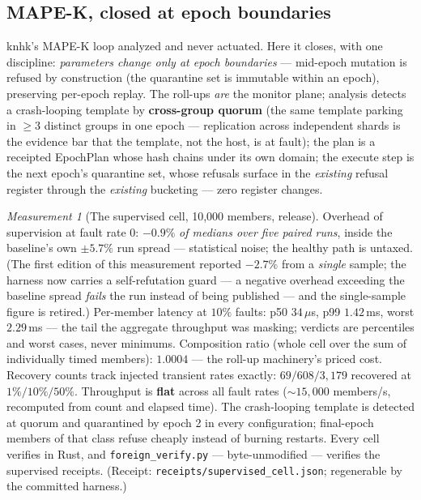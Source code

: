 \documentclass[11pt,a4paper]{article}
\theoremstyle{definition}
\theoremstyle{remark}
\newtheorem{measurement}[theorem]{Measurement}
\begin{document}
\subsection{MAPE-K, closed at epoch boundaries}

knhk's MAPE-K loop analyzed and never actuated. Here it closes, with one
discipline: \emph{parameters change only at epoch boundaries} ---
mid-epoch mutation is refused by construction (the quarantine set is
immutable within an epoch), preserving per-epoch replay. The roll-ups
\emph{are} the monitor plane; analysis detects a crash-looping template by
\textbf{cross-group quorum} (the same template parking in $\ge 3$ distinct
groups in one epoch --- replication across independent shards is the
evidence bar that the template, not the host, is at fault); the plan is a
receipted \textsf{EpochPlan} whose hash chains under its own domain; the
execute step is the next epoch's quarantine set, whose refusals surface in
the \emph{existing} refusal register through the \emph{existing}
bucketing --- zero register changes.

\begin{measurement}[The supervised cell, 10{,}000 members, release]
\label{meas:cell}
Overhead of supervision at fault rate $0$: $-0.9\%$ \emph{of medians over
five paired runs}, inside the baseline's own $\pm 5.7\%$ run spread ---
statistical noise; the healthy path is untaxed. (The first edition of this
measurement reported $-2.7\%$ from a \emph{single} sample; the harness now
carries a self-refutation guard --- a negative overhead exceeding the
baseline spread \emph{fails} the run instead of being published --- and
the single-sample figure is retired.) Per-member latency at $10\%$ faults:
p50 $34\,\mu$s, p99 $1.42$\,ms, worst $2.29$\,ms --- the tail the
aggregate throughput was masking; verdicts are percentiles and worst
cases, never minimums. Composition ratio (whole cell over the sum of
individually timed members): $1.0004$ --- the roll-up machinery's priced
cost. Recovery counts track injected transient rates exactly:
$69 / 608 / 3{,}179$ recovered at $1\% / 10\% / 50\%$. Throughput is
\textbf{flat} across all fault rates (${\sim}15{,}000$ members/s,
recomputed from count and elapsed time). The crash-looping template is
detected at quorum and quarantined by epoch 2 in every configuration;
final-epoch members of that class refuse cheaply instead of burning
restarts. Every cell verifies in Rust, and \texttt{foreign\_verify.py}
--- byte-unmodified --- verifies the supervised receipts. (Receipt:
\texttt{receipts/supervised\_cell.json}; regenerable by the committed
harness.)
\end{measurement}
\end{document}
